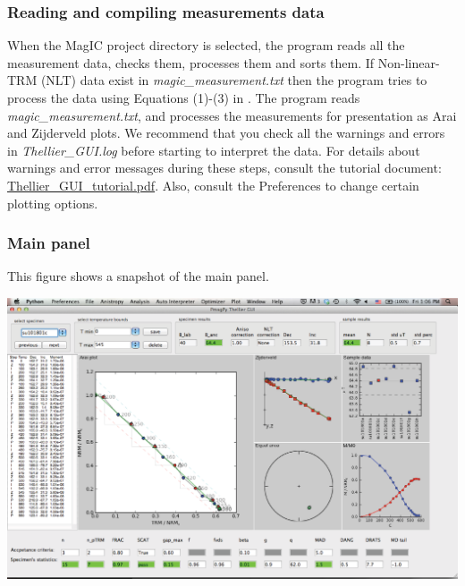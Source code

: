 \documentclass[11pt]{book}
\begin{document}
{{\subsubsection{Reading and compiling measurements data}
When the MagIC project directory is selected, the program  reads all the measurement data, checks them, processes them and sorts them. If Non-linear-TRM (NLT) data exist in {\it magic\_measurement.txt}  then the program tries to process the data using Equations (1)-(3) in \citet{shaar10}.  The program reads {\it magic\_measurement.txt}, and processes the measurements for presentation as Arai  and Zijderveld plots. 
We recommend that you check all the warnings and errors in {\it Thellier\_GUI.log} before starting to interpret the data.  For details about warnings and error messages during these steps, consult the tutorial document:  \href{http://earthref.org/PmagPy/pmagpydocs/Thellier_GUI_tutorial.pdf}{Thellier\_GUI\_tutorial.pdf}.  Also, consult the Preferences to change certain plotting options. 

\subsubsection{Main panel}

This figure shows a snapshot of the main panel. 

	\includegraphics[width=15cm]{EPSFiles/Screenshot_main_panel.eps}
	
}}
\end{document}
